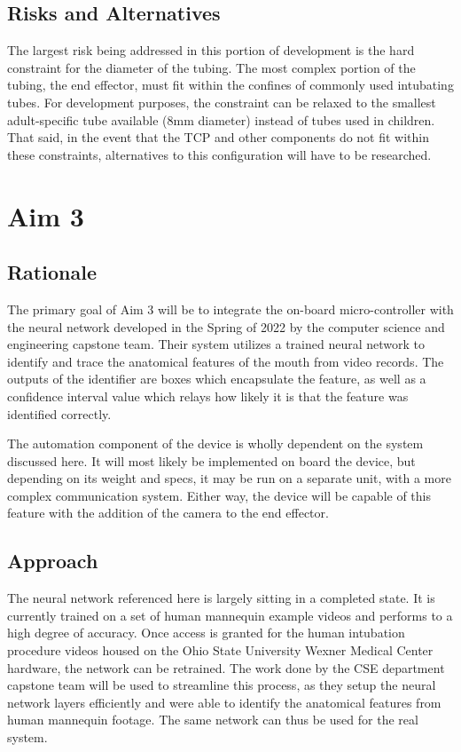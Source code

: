 \subsection{Risks and Alternatives}

The largest risk being addressed in this portion of development is the hard constraint for the diameter of the tubing. The most complex portion of the tubing, the end effector, must fit within the confines of commonly used intubating tubes. For development purposes, the constraint can be relaxed to the smallest adult-specific tube available (8mm diameter) instead of tubes used in children. That said, in the event that the TCP and other components do not fit within these constraints, alternatives to this configuration will have to be researched.

\section{Aim 3}

\subsection{Rationale}

The primary goal of Aim 3 will be to integrate the on-board micro-controller with the neural network developed in the Spring of 2022 by the computer science and engineering capstone team. Their system utilizes a trained neural network to identify and trace the anatomical features of the mouth from video records. The outputs of the identifier are boxes which encapsulate the feature, as well as a confidence interval value which relays how likely it is that the feature was identified correctly.

The automation component of the device is wholly dependent on the system discussed here. It will most likely be implemented on board the device, but depending on its weight and specs, it may be run on a separate unit, with a more complex communication system. Either way, the device will be capable of this feature with the addition of the camera to the end effector.

\subsection{Approach}

The neural network referenced here is largely sitting in a completed state. It is currently trained on a set of human mannequin example videos and performs to a high degree of accuracy. Once access is granted for the human intubation procedure videos housed on the Ohio State University Wexner Medical Center hardware, the network can be retrained. The work done by the CSE department capstone team will be used to streamline this process, as they setup the neural network layers efficiently and were able to identify the anatomical features from human mannequin footage. The same network can thus be used for the real system.

